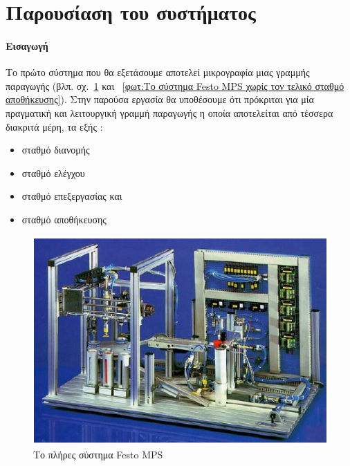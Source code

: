\documentclass[a4paper,12pt,twoside]{report}
\begin{document}
{%
		\section{Παρουσίαση του συστήματος}
		
			\paragraph{Εισαγωγή} {Το πρώτο σύστημα που θα εξετάσουμε αποτελεί μικρογραφία μιας γραμμής παραγωγής {\footnotesize (βλπ. σχ.~\ref{φωτ:Το πλήρες σύστημα Festo MPS} και ~\ref{φωτ:Το σύστημα Festo MPS χωρίς τον τελικό σταθμό αποθήκευσης})}. Στην παρούσα εργασία θα υποθέσουμε ότι πρόκριται για μία πραγματική και λειτουργική γραμμή παραγωγής η οποία αποτελείται από τέσσερα διακριτά μέρη, τα εξής :
			}
			\begin{itemize}
				\item σταθμό διανομής
				\item σταθμό ελέγχου
				\item σταθμό επεξεργασίας και
				\item σταθμό αποθήκευσης
			\end{itemize}
			
			\begin{figure}[hp]
					\centering
					\includegraphics[scale=0.75]{FestoMPSSystem2.png}
					\caption{Το πλήρες σύστημα Festo MPS\textregistered}
					\label{φωτ:Το πλήρες σύστημα Festo MPS}
			\end{figure}
			
}
\end{document}
